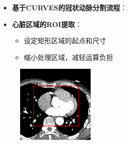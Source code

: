 \begin{frame}
\begin{itemize}
  \item \textbf{基于CURVES的冠状动脉分割流程}：
\end{itemize}
\begin{figure}[t]
\centering

\end{figure}
\end{frame}

\begin{frame}
\begin{itemize}
  \item \textbf{心脏区域的ROI提取}：
  \begin{itemize}
  \pause \item 设定矩形区域的起点和尺寸
  \pause \item 缩小处理区域，减轻运算负担
  \end{itemize}
\end{itemize}
\begin{figure}[t]
\centering
\includegraphics[width=1.5in]{../../Figures/coronary/ROI_Extraction}
\end{figure}
\end{frame}

